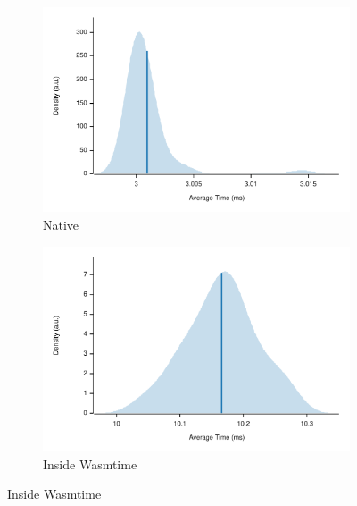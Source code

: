 \begin{figure}[h]
\centering
\begin{subfigure}{.5\textwidth}
  \centering
  \includegraphics[width=\linewidth]{figures/native_led}
  \caption{Native}
  \label{fig:native_led}
\end{subfigure}%
\begin{subfigure}{.5\textwidth}
  \centering
  \includegraphics[width=\linewidth]{figures/wasmtime_led}
  \caption{Inside Wasmtime}
  \label{fig:wasmtime_led}
\end{subfigure}


\end{figure}
